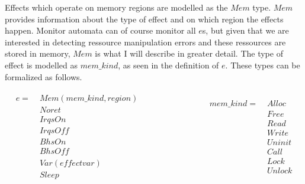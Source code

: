 \newpar Effects which operate on memory regions are modelled as the $Mem$ type. $Mem$ provides information about the type of effect and on which region the effects happen. Monitor automata can of course monitor all $e$s, but given that we are interested in detecting ressource manipulation errors and these ressources are stored in memory, $Mem$ is what I will describe in greater detail. The type of effect is modelled as $mem\_kind$, as seen in the definition of $e$. These types can be formalized as follows.

\begin{equation*} 
    \begin{split}
        \begin{aligned}
            e =\;   & \mathit{Mem} (mem\_kind, region) \\
                    & \mathit{Noret} \\
                    & \mathit{IrqsOn} \\
                    & \mathit{IrqsOff} \\
                    & \mathit{BhsOn} \\
                    & \mathit{BhsOff} \\
                    & \mathit{Var} (\mathit{effectvar}) \\
                    & \mathit{Sleep} \\
        \end{aligned}
    \end{split}
    \quad\quad\quad\quad\quad\quad\quad
    \begin{split}
        \begin{aligned}
            mem\_kind =\;   & \mathit{Alloc} \\
                            & \mathit{Free} \\
                            & \mathit{Read} \\
                            & \mathit{Write} \\
                            & \mathit{Uninit} \\
                            & \mathit{Call} \\
                            & \mathit{Lock} \\
                            & \mathit{Unlock} \\
        \end{aligned}
    \end{split}
\end{equation*}

